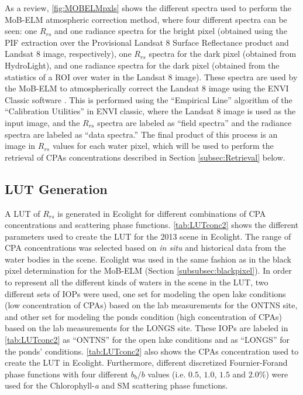 \documentclass[onecolumn,3p,letterpaper]{elsarticle}
\begin{document}
As a review, \autoref{fig:MOBELMpxls} shows the different spectra used to perform the MoB-ELM atmospheric correction method, where four different spectra can be seen: one $R_{rs}$ and one radiance spectra for the bright pixel (obtained using the PIF extraction over the Provisional Landsat 8 Surface Reflectance product and Landsat 8 image, respectively), one $R_{rs}$ spectra for the dark pixel (obtained from HydroLight), and one radiance spectra for the dark pixel (obtained from the statistics of a ROI over water in the Landsat 8 image). These spectra are used by the MoB-ELM to atmospherically correct the Landsat 8 image using the ENVI Classic software \citep{ENVIUserGuide}. This is performed using the ``Empirical Line'' algorithm of the ``Calibration Utilities'' in ENVI classic, where the Landsat 8 image is used as the input image, and the $R_{rs}$ spectra are labeled as ``field spectra'' and the radiance spectra are labeled as ``data spectra.'' The final product of this process is an image in $R_{rs}$ values for each water pixel, which will be used to perform the retrieval of CPAs concentrations described in Section \ref{subsec:Retrieval} below. 
\subsection{LUT Generation}
\label{subsec:LUT}
A LUT of $R_{rs}$ is generated in Ecolight for different combinations of CPA concentrations and scattering phase functions. \autoref{tab:LUTconc2} shows the different parameters used to create the LUT for the 2013 scene in Ecolight. The range of CPA concentrations was selected based on {\it in situ} and historical data from the water bodies in the scene. Ecolight was used in the same fashion as in the black pixel determination for the MoB-ELM (Section \ref{subsubsec:blackpixel}). In order to represent all the different kinds of waters in the scene in the LUT, two different sets of IOPs were used, one set for modeling the open lake conditions (low concentration of CPAs) based on the lab measurements for the ONTNS site, and other set for modeling the ponds condition (high concentration of CPAs) based on the lab measurements for the LONGS site. These IOPs are labeled in \autoref{tab:LUTconc2} as ``ONTNS'' for the open lake conditions and as ``LONGS'' for the ponds' conditions. \autoref{tab:LUTconc2} also shows the CPAs concentration used to create the LUT in Ecolight. Furthermore, different discretized Fournier-Forand phase functions with four different $b_b/b$ values (i.e. $0.5$, $1.0$, $1.5$ and $2.0\%$) were used for the Chlorophyll-{\it a} and SM scattering phase functions.
\end{document}
